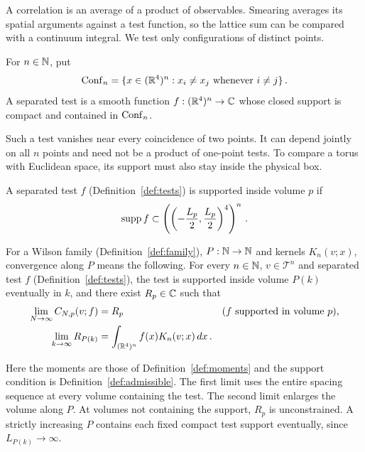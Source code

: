 A correlation is an average of a product of observables.
Smearing averages its spatial arguments against a test function, so the lattice sum can be compared with a continuum integral.
We test only configurations of distinct points.

\begin{definition}\label{def:tests}\label{def:separated-test}
For $n\in\mathbb N$, put
\begin{equation}\label{eq:conf}
\operatorname{Conf}_{n}=\{x\in(\mathbb R^4)^n:x_i\ne x_j\text{ whenever }i\ne j\}\,.
\end{equation}
A separated test is a smooth function $f:(\mathbb R^4)^n\to\mathbb C$ whose closed support is compact and contained in $\operatorname{Conf}_{n}$.
\end{definition}

Such a test vanishes near every coincidence of two points.
It can depend jointly on all $n$ points and need not be a product of one-point tests.
To compare a torus with Euclidean space, its support must also stay inside the physical box.

\begin{definition}\label{def:admissible}\label{def:admissible-test}
A separated test $f$ (Definition~\ref{def:tests}) is supported inside volume $p$ if
\begin{equation}\label{eq:admissible}
\operatorname{supp} f\subset
\left(\left(-\frac{L_p}{2},\frac{L_p}{2}\right)^4\right)^n\,.
\end{equation}
\end{definition}

\begin{definition}\label{def:ordered}
For a Wilson family (Definition~\ref{def:family}), $P:\mathbb N\to\mathbb N$ and kernels $K_n(v;x)$, convergence along $P$ means the following.
For every $n\in\mathbb N$, $v\in\mathcal T^n$ and separated test $f$ (Definition~\ref{def:tests}), the test is supported inside volume $P(k)$ eventually in $k$, and there exist $R_p\in\mathbb C$ such that
\begin{equation}\label{eq:ordered}
\begin{aligned}
\lim_{N\to\infty}C_{N,p}(v;f)&=R_p
&&\text{($f$ supported in volume $p$)},\\
\lim_{k\to\infty}R_{P(k)}&=\int_{(\mathbb R^4)^n}f(x)K_n(v;x)\,dx\,.
\end{aligned}
\end{equation}
\end{definition}

Here the moments are those of Definition~\ref{def:moments} and the support condition is Definition~\ref{def:admissible}.
The first limit uses the entire spacing sequence at every volume containing the test.
The second limit enlarges the volume along $P$.
At volumes not containing the support, $R_p$ is unconstrained.
A strictly increasing $P$ contains each fixed compact test support eventually, since $L_{P(k)}\to\infty$.

